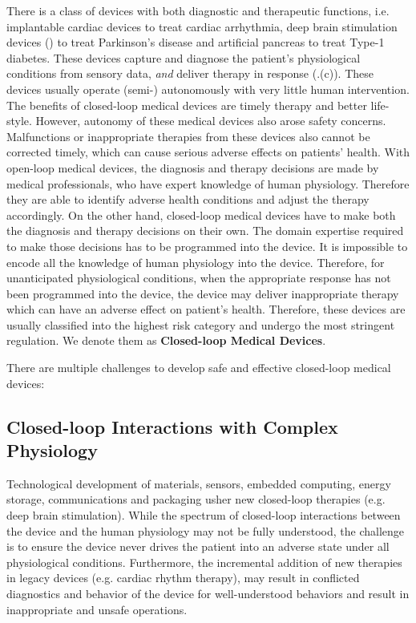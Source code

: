 There is a class of devices with both diagnostic and therapeutic functions, i.e. implantable cardiac devices to treat cardiac arrhythmia, deep brain stimulation devices (\cite{Brain_sti}) to treat Parkinson's disease and artificial pancreas to treat Type-1 diabetes. These devices capture and diagnose the patient's physiological conditions from sensory data, \emph{and} deliver therapy in response (.(c)). These devices usually operate (semi-) autonomously with very little human intervention. 
The benefits of closed-loop medical devices are timely therapy and better life-style.
However, autonomy of these medical devices also arose safety concerns. 
Malfunctions or inappropriate therapies from these devices also cannot be corrected timely, which can cause serious adverse effects on patients' health. 
With open-loop medical devices, the diagnosis and therapy decisions are made by medical professionals, who have expert knowledge of human physiology. Therefore they are able to identify adverse health conditions and adjust the therapy accordingly. On the other hand, closed-loop medical devices have to make both the diagnosis and therapy decisions on their own. The domain expertise required to make those decisions has to be programmed into the device. It is impossible to encode all the knowledge of human physiology into the device. Therefore, for unanticipated physiological conditions, when the appropriate response has not been programmed into the device, the device may deliver inappropriate therapy which can have an adverse effect on patient's health. 
Therefore, these devices are usually classified into the highest risk category and undergo the most stringent regulation. We denote them as \textbf{Closed-loop Medical Devices}. 

There are multiple challenges to develop safe and effective closed-loop medical devices:

\subsection{Closed-loop Interactions with Complex Physiology}


Technological development of materials, sensors, embedded computing, energy storage, communications and packaging usher new closed-loop therapies (e.g. deep brain stimulation). While the spectrum of closed-loop interactions between the device and the human physiology may not be fully understood, the challenge is to ensure the device never drives the patient into an adverse state under all physiological conditions. Furthermore, the incremental addition of new therapies in legacy devices (e.g. cardiac rhythm therapy), may result in conflicted diagnostics and behavior of the device for well-understood behaviors and result in inappropriate and unsafe operations. 

